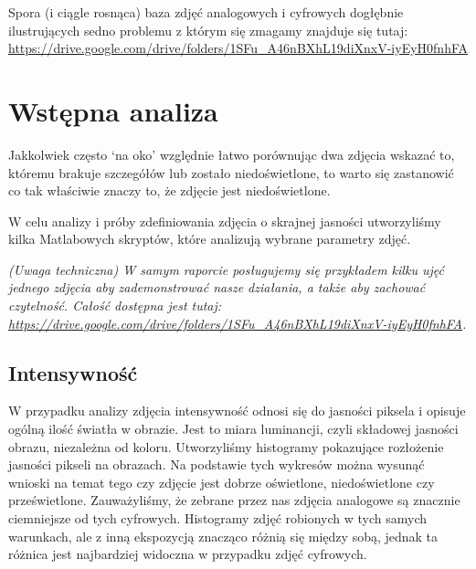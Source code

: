 \documentclass[options]{mwart}
\begin{document}
Spora (i ciągle rosnąca) baza zdjęć analogowych i cyfrowych dogłębnie ilustrujących
sedno problemu z którym się zmagamy znajduje się tutaj:
\url{https://drive.google.com/drive/folders/1SFu_A46nBXhL19diXnxV-iyEyH0fnhFA}








\section{Wstępna analiza}
Jakkolwiek często `na oko' względnie łatwo porównując dwa zdjęcia wskazać
to, któremu brakuje szczegółów lub zostało niedoświetlone, to warto się
zastanowić co tak właściwie znaczy to, że zdjęcie jest niedoświetlone. \newline

W celu analizy i próby zdefiniowania zdjęcia o skrajnej jasności
utworzyliśmy kilka Matlabowych skryptów, które analizują wybrane
parametry zdjęć. \newline

\textit{(Uwaga techniczna) W samym raporcie posługujemy się przykładem
    kilku ujęć jednego zdjęcia aby zademonstrować nasze działania, a także
    aby zachować czytelność. Całość dostępna jest tutaj: \url{https://drive.google.com/drive/folders/1SFu_A46nBXhL19diXnxV-iyEyH0fnhFA}.}


\newpage
\subsection{Intensywność}
W przypadku analizy zdjęcia intensywność odnosi się do jasności piksela i
opisuje ogólną ilość światła w obrazie. Jest to miara luminancji, czyli składowej
jasności obrazu, niezależna od koloru. Utworzyliśmy histogramy pokazujące rozłożenie
jasności pikseli na obrazach. Na podstawie tych wykresów można wysunąć wnioski na
temat tego czy zdjęcie jest dobrze oświetlone, niedoświetlone czy prześwietlone.
Zauważyliśmy, że zebrane przez nas zdjęcia analogowe są znacznie ciemniejsze od
tych cyfrowych. Histogramy zdjęć robionych w tych samych warunkach, ale z inną
ekspozycją znacząco różnią się między sobą, jednak ta różnica jest najbardziej
widoczna w przypadku zdjęć cyfrowych.
\end{document}
